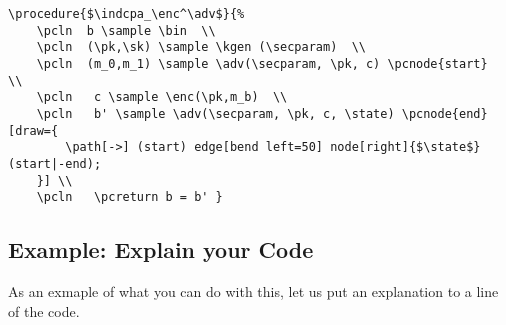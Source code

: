 \documentclass[a4paper]{report}
\begin{document}
\begin{lstlisting}
\procedure{$\indcpa_\enc^\adv$}{%
	\pcln  b \sample \bin  \\
	\pcln  (\pk,\sk) \sample \kgen (\secparam)  \\
	\pcln  (m_0,m_1) \sample \adv(\secparam, \pk, c) \pcnode{start}  \\
	\pcln   c \sample \enc(\pk,m_b)  \\
	\pcln   b' \sample \adv(\secparam, \pk, c, \state) \pcnode{end}[draw={
		\path[->] (start) edge[bend left=50] node[right]{$\state$} (start|-end);
	}] \\
	\pcln   \pcreturn b = b' }
\end{lstlisting}

\pagebreak
\subsection{Example: Explain your Code}
As an exmaple of what you can do with this, let us put an explanation to a line of the code.

\begin{center}
\begin{pcimage}

\end{pcimage}
\end{center}
\end{document}
